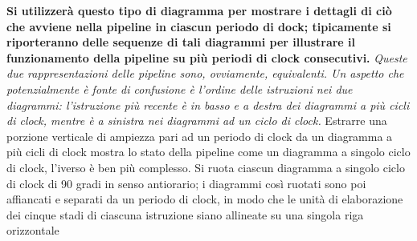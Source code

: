 \documentclass[a4paper,12pt, oneside]{book}
\begin{document}
\textbf{Si utilizzerà questo tipo di diagramma per mostrare i dettagli
  di ciò che avviene nella pipeline in ciascun periodo di dock;
  tipicamente si riporteranno delle sequenze di tali diagrammi per
  illustrare il funzionamento della pipeline su più periodi di
  clock consecutivi.}
\textit{Queste due rappresentazioni delle pipeline sono, ovviamente,
  equivalenti. Un aspetto che potenzialmente è fonte di confusione è
  l'ordine delle istruzioni nei due diagrammi: l'istruzione più
  recente è in basso e a destra dei diagrammi a più cicli di clock,
  mentre è a sinistra nei diagrammi ad un ciclo di clock.}
Estrarre una porzione verticale di ampiezza pari ad un periodo di clock da un
diagramma a più cicli di clock mostra lo stato della pipeline come un
diagramma a singolo ciclo di clock, l'iverso è ben più complesso. Si
ruota ciascun diagramma a singolo ciclo di clock di 90 gradi in senso
antiorario; i diagrammi così ruotati sono poi affiancati e separati da
un periodo di clock, in modo che le unità di elaborazione dei cinque
stadi di ciascuna istruzione siano allineate su una singola riga
orizzontale
\end{document}
